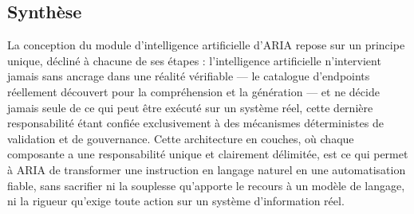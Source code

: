 \subsection*{Synthèse}

La conception du module d'intelligence artificielle d'ARIA repose sur un principe unique, décliné à chacune de ses étapes : l'intelligence artificielle n'intervient jamais sans ancrage dans une réalité vérifiable — le catalogue d'endpoints réellement découvert pour la compréhension et la génération — et ne décide jamais seule de ce qui peut être exécuté sur un système réel, cette dernière responsabilité étant confiée exclusivement à des mécanismes déterministes de validation et de gouvernance. Cette architecture en couches, où chaque composante a une responsabilité unique et clairement délimitée, est ce qui permet à ARIA de transformer une instruction en langage naturel en une automatisation fiable, sans sacrifier ni la souplesse qu'apporte le recours à un modèle de langage, ni la rigueur qu'exige toute action sur un système d'information réel.
